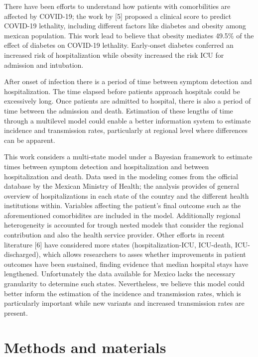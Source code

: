 \documentclass[10pt,letterpaper]{article}
\begin{document}
There have been efforts to understand how patients with comorbilities
are affected by COVID-19; the work by {[}5{]} proposed a clinical score
to predict COVID-19 lethality, including different factors like diabetes
and obesity among mexican population. This work lead to believe that
obesity mediates 49.5\% of the effect of diabetes on COVID-19 lethality.
Early-onset diabetes conferred an increased risk of hospitalization
while obesity increased the risk ICU for admission and intubation.

After onset of infection there is a period of time between symptom
detection and hospitalization. The time elapsed before patients approach
hospitals could be excessively long. Once patients are admitted to
hospital, there is also a period of time between the admission and
death. Estimation of these lengths of time through a multilevel model
could enable a better information system to estimate incidence and
transmission rates, particularly at regional level where differences can
be apparent.

This work considers a multi-state model under a Bayesian framework to
estimate times between symptom detection and hospitalization and between
hospitalization and death. Data used in the modeling comes from the
official database by the Mexican Ministry of Health; the analysis
provides of general overview of hospitalizations in each state of the
country and the different health institutions within. Variables
affecting the patient's final outcome such as the aforementioned
comorbidites are included in the model. Additionally regional
heterogeneity is accounted for trough nested models that consider the
regional contribution and also the health service provider. Other
efforts in recent literature {[}6{]} have considered more states
(hospitalization-ICU, ICU-death, ICU-discharged), which allows
researchers to asses whether improvements in patient outcomes have been
sustained, finding evidence that median hospital stays have lengthened.
Unfortunately the data available for Mexico lacks the necessary
granularity to determine such states. Nevertheless, we believe this
model could better inform the estimation of the incidence and
transmission rates, which is particularly important while new variants
and increased transmission rates are present.

\section{Methods and materials}\label{methods-and-materials}
\end{document}
